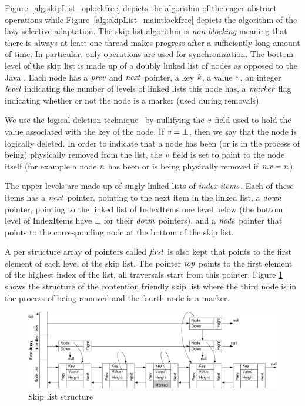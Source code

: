 
%

%

Figure~\ref{alg:skipList_oplockfree} depicts the algorithm of the eager abstract operations while Figure~\ref{alg:skipList_maintlockfree} depicts the algorithm of the lazy selective adaptation. 
The skip list algorithm is \emph{non-blocking} meaning that
there is always at least one thread makes progress after a sufficiently long
amount of time.
In particular, only \CAS{} operations are used for synchronization.
The bottom level of the skip list is made up of a doubly linked list of nodes as opposed to the Java .
Each node has a $\ms{prev}$ and $\ms{next}$ pointer, a key $\ms{k}$,
a value $\ms{v}$,
an integer $\ms{level}$ indicating the number of levels of linked lists this node has,
a $\ms{marker}$ flag indicating whether or not the node is a marker (used during removals).

We use the logical deletion technique~\cite{Har01} by
nullifying the $\ms{v}$ field used to hold the value associated with the key of the node.
If $\ms{v} = \bot$, then we say that the node is logically deleted.
In order to indicate that a node has been (or is in the process of being) physically removed from the list, the $\ms{v}$ field is set to point to the
node itself (for example a node $\ms{n}$ has been or is being physically removed if $\ms{n.v =n}$).

The upper levels are made up of singly linked lists of $\ms{index-items}$.
Each of these items has a $\ms{next}$ pointer, pointing to the next item in the linked list,
a $\ms{down}$ pointer, pointing to the linked list of IndexItems one level below (the bottom level
of IndexItems have $\bot$ for their $\ms{down}$ pointers),
and a $\ms{node}$ pointer that points to the corresponding node at the bottom of the skip list.

A per structure array of pointers called $\ms{first}$ is also kept that points to the first element of each level
of the skip list.
The pointer $\ms{top}$ points to the first element of the highest index of the list, all traversals
start from this pointer.
Figure \ref{fig:diagram} shows the structure of the contention friendly skip list where the third node
is in the process of being removed and the fourth node is a marker.

\begin{figure}\label{fig:diagram}
	\begin{center}
	\includegraphics[scale=0.128]{Skip-list/fig/skiplist_diagram}
	\end{center}
	\caption{Skip list structure}
\end{figure}


